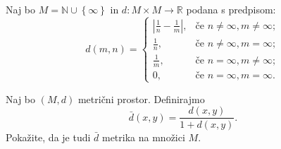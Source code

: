 \documentclass[11pt,a4paper]{exam}
\renewcommand{\{}{\lbrace}
\renewcommand{\}}{\rbrace}
\begin{document}
\begin{questions}
		
	\question Naj bo $M = \mathbb{N} \cup \left\{ \infty \right\}$ in $d: M \times M \to \mathbb{R}$ podana s predpisom:
	\[d(m,n) = 
		\begin{cases}
			\left| \frac{1}{n} - \frac{1}{m} \right|,  & \text{če } n \neq \infty, m\neq \infty; \\
			\frac{1}{n},  & \text{če } n \neq \infty, m =  \infty; \\
			\frac{1}{m},  & \text{če } n = \infty, m\neq \infty; \\
			0,  & \text{če } n = \infty, m = \infty.
		\end{cases}
	\]

	\question Naj bo $(M,d)$ metrični prostor. Definirajmo \[\bar{d}\left( x,y \right) = \frac{d(x,y)}{1+d(x,y)}.\] Pokažite, da je tudi $\bar{d}$ metrika na množici $M$.


\end{questions}
\end{document}
